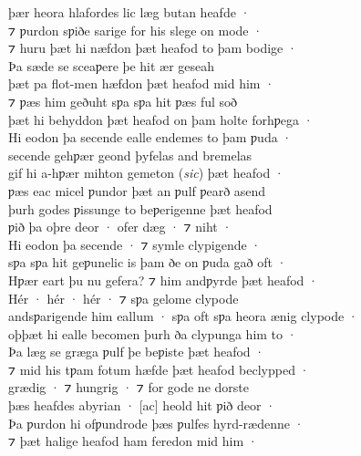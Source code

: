 \documentclass[10pt]{book}
\begin{document}
\settowidth{}

\begin{center}
\parbox{\pagelen}{

þ\ae{}r heora hlafordes lic l\ae{}g butan heafde · \\
⁊ ƿurdon sƿiðe sarige for his slege on mode · \\
⁊ huru þ\ae{}t hi n\ae{}fdon þ\ae{}t heafod to þam bodige · \\
Þa s\ae{}de se sceaƿere þe hit \ae{}r geseah \\
þ\ae{}t pa flot-men h\ae{}fdon þ\ae{}t heafod mid him · \\
⁊ ƿ\ae{}s him geðuht sƿa sƿa hit ƿ\ae{}s ful soð \\
þ\ae{}t hi behyddon þ\ae{}t heafod on þam holte forhƿega · \\
Hi eodon þa secende ealle endemes to þam ƿuda · \\
secende gehƿ\ae{}r geond þyfelas and bremelas \\
gif hi a-hƿ\ae{}r mihton gemeton (\emph{sic}) þ\ae{}t heafod · \\
ƿ\ae{}s eac micel ƿundor þ\ae{}t an ƿulf ƿearð asend \\
þurh godes ƿissunge to beƿerigenne þ\ae{}t heafod \\
ƿið þa oþre deor · ofer d\ae{}g · ⁊ niht · \\
Hi eodon þa secende · ⁊ symle clypigende · \\
sƿa sƿa hit geƿunelic is þam ðe on ƿuda gað oft · \\
Hƿ\ae{}r eart þu nu gefera? ⁊ him andƿyrde þ\ae{}t heafod · \\
H\'er · h\'er · h\'er · ⁊ sƿa gelome clypode \\
andsƿarigende him eallum · sƿa oft sƿa heora \ae{}nig clypode · \\
oþþ\ae{}t hi ealle becomen þurh ða clypunga him to · \\
Þa l\ae{}g se gr\ae{}ga ƿulf þe beƿiste þ\ae{}t heafod · \\
⁊ mid his tƿam fotum h\ae{}fde þ\ae{}t heafod beclypped · \\
gr\ae{}dig · ⁊ hungrig · ⁊ for gode ne dorste \\
þ\ae{}s heafdes abyrian · [ac] heold hit ƿið deor · \\
Þa ƿurdon hi ofƿundrode þ\ae{}s ƿulfes hyrd-r\ae{}denne · \\
⁊ þ\ae{}t halige heafod ham feredon mid him · \\
}
\end{center}
\end{document}
